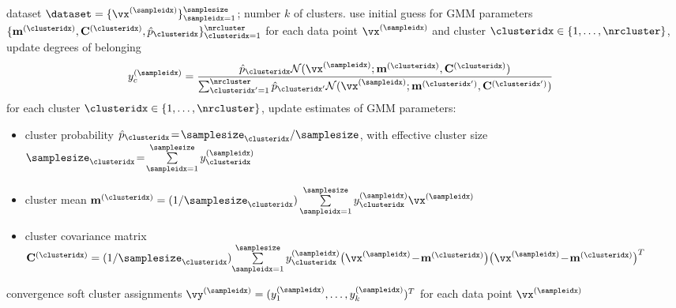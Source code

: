 \documentclass[12pt]{report}
\begin{document}
\begin{algorithm}[htbp]
\begin{algorithmic}[1]
\renewcommand{\algorithmicrequire}{\textbf{Input:}}
\renewcommand{\algorithmicensure}{\textbf{Output:}}
\Require   dataset $\dataset=\{ \vx^{(\sampleidx)}\}_{\sampleidx=1}^{\samplesize}$; number $k$ of clusters. 
\Statex\hspace{-6mm}{\bf Initialize:} use initial guess for GMM parameters $\{\mathbf{m}^{(\clusteridx)},\mathbf{C}^{(\clusteridx)},\hat{p}_{\clusteridx}\}_{\clusteridx=1}^{\nrcluster}$ 
\Repeat
\vspace*{2mm}
\State for each data point $\vx^{(\sampleidx)}$ and cluster $\clusteridx \in \{1,\ldots,\nrcluster\}$, update degrees of belonging
\vspace*{-1mm}
\begin{align}
\label{equ_update_soft_cluster_assignm}
y_{c}^{(\sampleidx)} & =  \frac{\hat{p}_{\clusteridx} \mathcal{N}(\vx^{(\sampleidx)};\mathbf{m}^{(\clusteridx)},\mathbf{C}^{(\clusteridx)})}{\sum_{\clusteridx'=1}^{\nrcluster} \hat{p}_{\clusteridx'}\mathcal{N}(\vx^{(\sampleidx)};\mathbf{m}^{(\clusteridx')},\mathbf{C}^{(\clusteridx')})} %
\end{align}
\State for each cluster $\clusteridx \in \{1,\ldots,\nrcluster\}$, update estimates of GMM parameters: 
\begin{itemize} 
\item cluster probability $\hat{p}_{\clusteridx}\!=\!\samplesize_{\clusteridx}/\samplesize$, with effective cluster size $\samplesize_{\clusteridx}\!=\!\sum\limits_{\sampleidx=1}^{\samplesize} y_{\clusteridx}^{(\sampleidx)}$
\item cluster mean $\mathbf{m}^{(\clusteridx)} = (1/\samplesize_{\clusteridx}) \sum\limits_{\sampleidx=1}^{\samplesize} y_{\clusteridx}^{(\sampleidx)} \vx^{(\sampleidx)}$ 
\item cluster covariance matrix $\mathbf{C}^{(\clusteridx)}  = (1/\samplesize_{\clusteridx}) {\sum\limits_{\sampleidx=1}^{\samplesize} y_{\clusteridx}^{(\sampleidx)} \big(\vx^{(\sampleidx)}\!-\!\mathbf{m}^{(\clusteridx)}\big)   \big(\vx^{(\sampleidx)}\!-\!\mathbf{m}^{(\clusteridx)}\big)^{T} }$
\end{itemize}
\vspace*{1mm}
\Until convergence
\Ensure soft cluster assignments $\vy^{(\sampleidx)}=(y_{1}^{(\sampleidx)},\ldots,y_{k}^{(\sampleidx)})^{T}$ for each data point $\vx^{(\sampleidx)}$ 
\end{algorithmic}
\end{algorithm}
\end{document}
